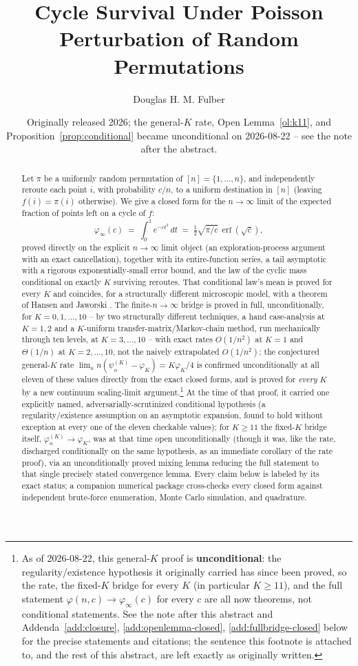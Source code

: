 \documentclass[11pt]{article}
\title{Cycle Survival Under Poisson Perturbation of Random Permutations}
\author{Douglas H. M. Fulber}
\date{Originally released 2026; the general-$K$ rate, Open
Lemma~\ref{ol:k11}, and Proposition~\ref{prop:conditional} became
unconditional on 2026-08-22 -- see the note after the abstract.}
\theoremstyle{remark}
\newcommand{\phiinf}{\varphi_\infty}
\begin{document}
\maketitle

\begin{abstract}
Let $\pi$ be a uniformly random permutation of $[n]=\{1,\dots,n\}$, and
independently reroute each point $i$, with probability $c/n$, to a
uniform destination in $[n]$ (leaving $f(i)=\pi(i)$ otherwise). We give
a closed form for the $n\to\infty$ limit of the expected fraction of
points left on a cycle of $f$:
\[
  \phiinf(c) \;=\; \int_0^1 e^{-c t^2}\,dt \;=\; \tfrac12\sqrt{\pi/c}\,
  \operatorname{erf}(\sqrt c),
\]
proved directly on the explicit $n\to\infty$ limit object (an
exploration-process argument with an exact cancellation), together with
its entire-function series, a tail asymptotic with a rigorous
exponentially-small error bound, and the law of the cyclic mass
conditional on exactly $K$ surviving reroutes. That conditional law's
mean is proved for every $K$ and coincides, for a structurally different
microscopic model, with a theorem of Hansen and Jaworski
\cite{hansenjaworski2014}. The finite-$n\to\infty$ bridge is proved in
full, unconditionally, for $K=0,1,\dots,10$ -- by two structurally
different techniques, a hand case-analysis at $K=1,2$ and a $K$-uniform
transfer-matrix/Markov-chain method, run mechanically through ten
levels, at $K=3,\dots,10$ -- with exact rates $O(1/n^2)$ at $K=1$ and
$\Theta(1/n)$ at $K=2,\dots,10$, not the naively extrapolated
$O(1/n^2)$; the conjectured general-$K$ rate
$\lim_n n(\psi_n^{(K)}-\varphi_K)=K\varphi_K/4$ is confirmed
unconditionally at all eleven of these values directly from the exact
closed forms, and is proved for \emph{every} $K$ by a new continuum
scaling-limit argument.\footnote{As of 2026-08-22, this general-$K$
proof is \textbf{unconditional}: the regularity/existence hypothesis it
originally carried has since been proved, so the rate, the fixed-$K$
bridge for every $K$ (in particular $K\ge11$), and the full statement
$\varphi(n,c)\to\phiinf(c)$ for every $c$ are all now theorems, not
conditional statements. See the note after this abstract and
Addenda~\ref{add:closure}, \ref{add:openlemma-closed},
\ref{add:fullbridge-closed} below for the precise statements and
citations; the sentence this footnote is attached to, and the rest of
this abstract, are left exactly as originally written.} At the time of
that proof, it carried one explicitly named, adversarially-scrutinized
conditional hypothesis (a regularity/existence assumption on an
asymptotic expansion, found to hold without exception at every one of
the eleven checkable values); for $K\ge11$ the fixed-$K$ bridge itself,
$\varphi_n^{(K)}\to\varphi_K$, was at that time open unconditionally
(though it was, like the rate, discharged conditionally on the same
hypothesis, as an immediate corollary of the rate proof), via an
unconditionally proved mixing lemma reducing the
full statement to that single precisely stated convergence lemma. Every
claim below is labeled by its exact status;
a companion numerical package cross-checks every closed form against
independent brute-force enumeration, Monte Carlo simulation, and
quadrature.
\end{abstract}
\end{document}
